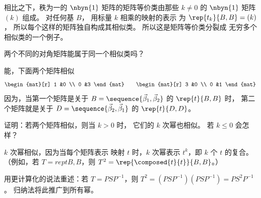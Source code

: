 \begin{exercises}
\begin{answer}
       相比之下，秩为一的 
       \( \nbyn{1} \) 矩阵的矩阵等价类由那些 
       \( k\neq 0 \) 的 $\nbyn{1}$ 矩阵 \( (k) \) 组成。
       对任何基 \( B \)，
       用标量 \( k \) 相乘的映射的表示
       为 \( \rep{t_k}{B,B}=(k) \)，
       所以每个这样的矩阵独自构成其相似类。
       所以这是矩阵等价类分裂成
       无穷多个相似类的一个例子。  
      \end{answer}
  \item 
     两个不同的对角矩阵能属于同一个相似类吗？
     \begin{answer}
       能，下面两个矩阵相似
       \begin{equation*}
          \begin{mat}[r]
            1  &0  \\
            0  &3
          \end{mat}
          \qquad
          \begin{mat}[r]
            3  &0  \\
            0  &1
          \end{mat}
       \end{equation*}
       因为，当第一个矩阵是关于 
       $B=\sequence{\vec{\beta}_1,\vec{\beta}_2}$ 的 $\rep{t}{B,B}$ 时， 
       第二个矩阵就是关于 
       $D=\sequence{\vec{\beta}_2,\vec{\beta}_1}$ 的 $\rep{t}{D,D}$。
      \end{answer}
  \recommended \item
     证明：若两个矩阵相似，则当 \( k>0 \) 时，
     它们的 \( k \) 次幂也相似。
     若 \( k\leq 0 \) 会怎样？
     \begin{answer}
       \( k \) 次幂相似，因为当每个矩阵表示
       映射 $t$ 时，\( k \) 次幂表示
       \( t^k \)，即 $k$ 个 $t$ 的复合。
       （例如，若 $T=rep{t}{B,B}$，则 $T^2=\rep{\composed{t}{t}}{B,B}$。）

       用更计算化的说法重述：若 \( T=PSP^{-1} \)，则
       \( T^2=(PSP^{-1})(PSP^{-1})=PS^2P^{-1} \)。
       归纳法将此推广到所有幂。


\end{answer}
\end{exercises}

